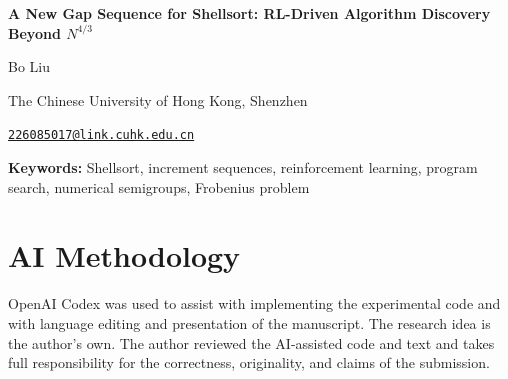 \documentclass[11pt,letterpaper]{article}
\theoremstyle{definition}
\theoremstyle{remark}
\newcommand{\papertitle}{A New Gap Sequence for Shellsort: RL-Driven Algorithm Discovery Beyond $N^{4/3}$}
\begin{document}
\hypersetup{pageanchor=false}
\begin{titlepage}
  \centering
  \vspace*{0.10\textheight}
  {\LARGE\bfseries \papertitle\par}
  \vspace{1.5em}
  {\large Bo Liu\par}
  \vspace{0.35em}
  {\normalsize The Chinese University of Hong Kong, Shenzhen\par}
  \vspace{0.25em}
  {\small\href{mailto:226085017@link.cuhk.edu.cn}%
    {\nolinkurl{226085017@link.cuhk.edu.cn}}\par}
  \vspace{1.8em}

  \begin{minipage}{0.86\textwidth}
    \begin{abstract}
      
    \end{abstract}

    \vspace{1em}
    \noindent\textbf{Keywords:}
    Shellsort, increment sequences, reinforcement learning, program search,
    numerical semigroups, Frobenius problem
  \end{minipage}
\end{titlepage}

\setcounter{page}{1}
\hypersetup{pageanchor=true}







\clearpage
\appendix


\section*{AI Methodology}
OpenAI Codex was used to assist with implementing the experimental code and
with language editing and presentation of the manuscript.  The research idea
is the author's own.  The author reviewed the AI-assisted code and text and
takes full responsibility for the correctness, originality, and claims of the
submission.



\end{document}
